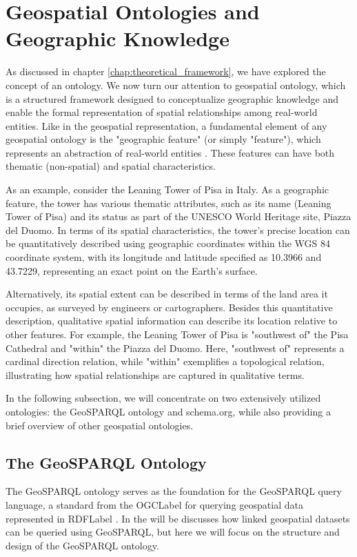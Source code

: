 \section{Geospatial Ontologies and Geographic Knowledge}\label{III-sec:geospatialOntologies}

As discussed in chapter \ref{chap:theoretical_framework}, we have explored the concept of an ontology. We now turn our attention to geospatial ontology, which is a structured framework designed to conceptualize geographic knowledge and enable the formal representation of spatial relationships among real-world entities. Like in the geospatial representation, a fundamental element of any geospatial ontology is the "geographic feature" (or simply "feature"), which represents an abstraction of real-world entities \cite{longleyGeographicInformationScience2015}. These features can have both thematic (non-spatial) and spatial characteristics.

As an example, consider the Leaning Tower of Pisa in Italy. As a geographic feature, the tower has various thematic attributes, such as its name (Leaning Tower of Pisa) and its status as part of the UNESCO World Heritage site, Piazza del Duomo. In terms of its spatial characteristics, the tower’s precise location can be quantitatively described using geographic coordinates within the WGS 84 coordinate system, with its longitude and latitude specified as 10.3966 and 43.7229, representing an exact point on the Earth’s surface.

Alternatively, its spatial extent can be described in terms of the land area it occupies, as surveyed by engineers or cartographers. Besides this quantitative description, qualitative spatial information can describe its location relative to other features. For example, the Leaning Tower of Pisa is "southwest of" the Pisa Cathedral and "within" the Piazza del Duomo. Here, "southwest of" represents a cardinal direction relation, while "within" exemplifies a topological relation, illustrating how spatial relationships are captured in qualitative terms.

In the following subsection, we will concentrate on two extensively utilized ontologies: the GeoSPARQL ontology and schema.org, while also providing a brief overview of other geospatial ontologies.

\subsection{The GeoSPARQL Ontology}\label{III-subsec:geosparql}
The GeoSPARQL ontology serves as the foundation for the GeoSPARQL query language, a standard from the \acrfull{OGCLabel} for querying geospatial data represented in \acrshort{RDFLabel} \cite{matthewperryOGCGeoSPARQLGeographic2012}. In the  will be discusses how linked geospatial datasets can be queried using GeoSPARQL, but here we will focus on the structure and design of the GeoSPARQL ontology.

